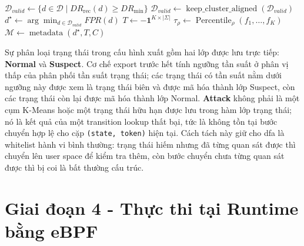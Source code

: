 \documentclass[../main.tex]{subfiles}
\begin{document}
\begin{algorithm}[H]
  \caption{Xuất DFA runtime từ các cụm K-Means}
  \label{alg:export_dfa}
  \SetAlgoLined
  \DontPrintSemicolon
  \BlankLine
  $\mathcal{D}_{valid} \gets
  \{d \in \mathcal{D} \mid DR_{\text{rec}}(d) \geq DR_{\min}\}$\;
  $\mathcal{D}_{valid} \gets
  \operatorname{keep\_cluster\_aligned}(\mathcal{D}_{valid})$\;
  $d^\star \gets \arg\min_{d \in \mathcal{D}_{valid}} FPR(d)$\;
  \BlankLine
  $T \gets -\mathbf{1}^{K \times |\Sigma|}$\;
  \BlankLine
  $\tau_{\rho} \gets \operatorname{Percentile}_{\rho}(f_1,\ldots,f_K)$\;
  \BlankLine
  $\mathcal{M} \gets \operatorname{metadata}(d^\star, T, C)$\;
  \;
\end{algorithm}

Sự phân loại trạng thái trong cấu hình xuất gồm hai lớp được lưu trực tiếp:
\textbf{Normal} và \textbf{Suspect}. Cơ chế export trước hết tính
ngưỡng tần suất ở
phân vị thấp của phân phối tần suất trạng thái; các trạng thái có tần
suất nằm dưới
ngưỡng này được xem là trạng thái biên và được mã hóa thành lớp
Suspect, còn các trạng
thái còn lại được mã hóa thành lớp Normal. \textbf{Attack} không phải là một cụm
K-Means hoặc một trạng thái hữu hạn được lưu trong hàm lớp trạng
thái; nó là kết quả
của một transition lookup thất bại, tức là không tồn tại bước chuyển
hợp lệ cho cặp
\texttt{(state, token)} hiện tại. Cách tách này giữ cho \gls{dfa} là
whitelist hành vi bình
thường: trạng thái hiếm nhưng đã từng quan sát được thì chuyển lên
user space để kiểm
tra thêm, còn bước chuyển chưa từng quan sát được thì bị coi là bất
thường cấu trúc.

\section{Giai đoạn 4 - Thực thi tại Runtime bằng eBPF}
\label{sec:phase4}
\end{document}
